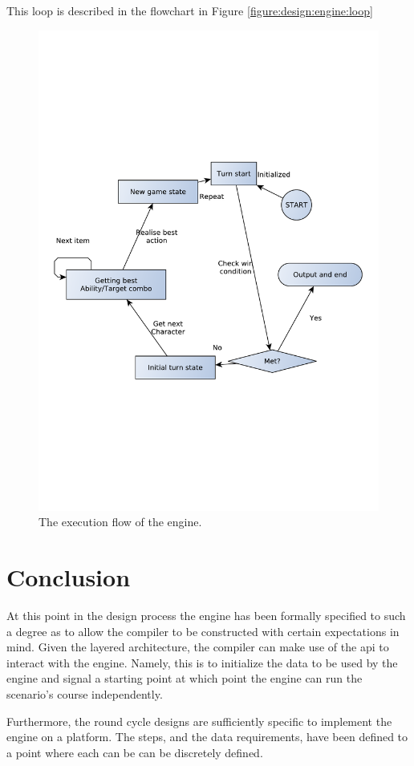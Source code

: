 This loop is described in the flowchart in Figure \vref{figure:design:engine:loop}

\begin{figure}[h]
\centering
\includegraphics[scale=0.5, clip=true, trim=1cm 8cm 1cm 8cm]{img/engine_exec_loop}
\caption{\label{figure:design:engine:loop}The execution flow of the engine.}
\end{figure}

\section{Conclusion}
At this point in the design process the engine has been formally specified to such a degree as to allow the compiler to be constructed with certain expectations in mind. Given the layered architecture, the compiler can make use of the \ac{api} to interact with the engine. Namely, this is to initialize the data to be used by the engine and signal a starting point at which point the engine can run the scenario's course independently.

Furthermore, the round cycle designs are sufficiently specific to implement the engine on a platform. The steps, and the data requirements, have been defined to a point where each can be can be discretely defined.
